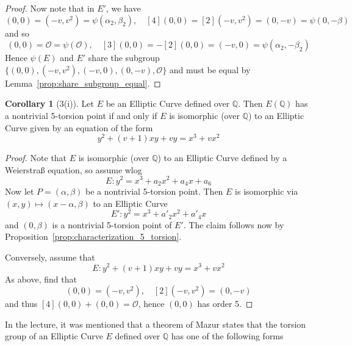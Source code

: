 \documentclass{scrartcl}
\newcommand{\Q}{\mathbb{Q}}
\renewcommand{\O}{\mathcal{O}}
\theoremstyle{definition}
\newtheorem{corollary}[subsection]{Corollary}
\begin{document}
\begin{proof}
    Now note that in $E'$, we have
    \begin{equation*}
        [2](0, 0) = (-v, v^2) = \psi(\alpha_2, \beta_2), \quad [4](0, 0) = [2](-v, v^2) = (0, -v) = \psi(0, -\beta)
    \end{equation*}
    and so
    \begin{equation*}
        [5](0, 0) = \O = \psi(\O), \quad [3](0, 0) = -[2](0, 0) = (-v, 0) = \psi(\alpha_2, -\beta_2) 
    \end{equation*}
    Hence $\psi(E)$ and $E'$ share the subgroup $\{ (0, 0), (-v, v^2), (-v, 0), (0, -v), \O \}$ and must be equal by Lemma~\ref{prop:share_subgroup_equal}.
\end{proof}
\begin{corollary}[3(i)]
    Let $E$ be an Elliptic Curve defined over $\Q$.
    Then $E(\Q)$ has a nontrivial 5-torsion point if and only if $E$ is isomorphic (over $\Q$) to an Elliptic Curve given by an equation of the form
    \begin{equation*}
        y^2 + (v + 1)x y + v y = x^3 + v x^2
    \end{equation*}
\end{corollary}
\begin{proof}
    Note that $E$ is isomorphic (over $\Q$) to an Elliptic Curve defined by a Weierstraß equation, so assume wlog
    \begin{equation*}
        E: y^2 = x^3 + a_2 x^2 + a_4 x + a_6
    \end{equation*}
    Now let $P = (\alpha, \beta)$ be a nontrivial 5-torsion point.
    Then $E$ is isomorphic via $(x, y) \mapsto (x - \alpha, \beta)$ to an Elliptic Curve
    \begin{equation*}
        E': y^2 = x^3 + a'_2 x^2 + a'_4 x
    \end{equation*}
    and $(0, \beta)$ is a nontrivial 5-torsion point of $E'$.
    The claim follows now by Proposition~\ref{prop:characterization_5_torsion}.

    Conversely, assume that
    \begin{equation*}
        E: y^2 + (v + 1) x y + v y = x^3 + v x^2
    \end{equation*}
    As above, find that
    \begin{equation*}
        [2](0, 0) = (-v, v^2), \quad [2](-v, v^2) = (0, -v)
    \end{equation*}
    and thus $[4](0, 0) + (0, 0) = \O$, hence $(0, 0)$ has order 5.
\end{proof}
In the lecture, it was mentioned that a theorem of Mazur states that the torsion group of an Elliptic Curve $E$ defined over $\Q$ has one of the following forms
\end{document}
